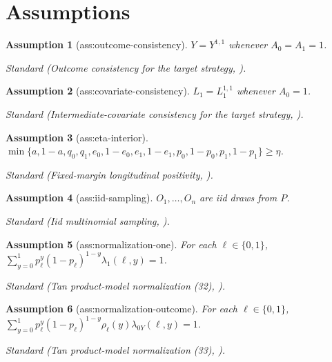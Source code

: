 \documentclass{article}
\newtheorem{assumption}{Assumption}
\begin{document}
\section{Assumptions}

\begin{assumption}[ass:outcome-consistency]\label{ass:outcome-consistency}
\(Y=Y^{1,1}\) whenever \(A_0=A_1=1\).
\par\smallskip\noindent\emph{Standard} (Outcome consistency for the target strategy, \cite{tan2025sequential}).
\end{assumption}

\begin{assumption}[ass:covariate-consistency]\label{ass:covariate-consistency}
\(L_1=L_1^{1,1}\) whenever \(A_0=1\).
\par\smallskip\noindent\emph{Standard} (Intermediate-covariate consistency for the target strategy, \cite{tan2025sequential}).
\end{assumption}

\begin{assumption}[ass:eta-interior]\label{ass:eta-interior}
\(\min\{a,1-a,q_0,q_1,e_0,1-e_0,e_1,1-e_1,p_0,1-p_0,p_1,1-p_1\}\geq\eta\).
\par\smallskip\noindent\emph{Standard} (Fixed-margin longitudinal positivity, \cite{tan2025sequential}).
\end{assumption}

\begin{assumption}[ass:iid-sampling]\label{ass:iid-sampling}
\(O_1,\ldots,O_n\) are iid draws from \(P\).
\par\smallskip\noindent\emph{Standard} (Iid multinomial sampling, \cite{zhangzhao2026average}).
\end{assumption}

\begin{assumption}[ass:normalization-one]\label{ass:normalization-one}
For each \(\ell\in\{0,1\}\), \(\sum_{y=0}^1 p_\ell^y(1-p_\ell)^{1-y}\lambda_1(\ell,y)=1\).
\par\smallskip\noindent\emph{Standard} (Tan product-model normalization (32), \cite{tan2025sequential}).
\end{assumption}

\begin{assumption}[ass:normalization-outcome]\label{ass:normalization-outcome}
For each \(\ell\in\{0,1\}\), \(\sum_{y=0}^1 p_\ell^y(1-p_\ell)^{1-y}\rho_\ell(y)\lambda_{0Y}(\ell,y)=1\).
\par\smallskip\noindent\emph{Standard} (Tan product-model normalization (33), \cite{tan2025sequential}).
\end{assumption}
\end{document}
